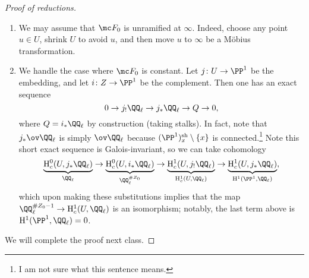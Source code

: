 \documentclass[../notes.tex]{subfiles}
\begin{document}
\begin{proof}[Proof of reductions]
\begin{enumerate}
		\item We may assume that $\mc F_0$ is unramified at $\infty$. Indeed, choose any point $u\in U$, shrink $U$ to avoid $u$, and then move $u$ to $\infty$ be a M\"obius transformation.

		\item We handle the case where $\mc F_0$ is constant. Let $j\colon U\to\PP^1$ be the embedding, and let $i\colon Z\to\PP^1$ be the complement. Then one has an exact sequence
		\[0\to j_!\QQ_\ell\to j_*\QQ_\ell\to Q\to0,\]
		where $Q=i_*\QQ_\ell$ by construction (taking stalks). In fact, note that $j_*\ov\QQ_\ell$ is simply $\ov\QQ_\ell$ because $(\PP^1)^{\mathrm{sh}}_x\setminus\{x\}$ is connected.\footnote{I am not sure what this sentence means.} Note this short exact sequence is Galois-invariant, so we can take cohomology
		\[\underbrace{\mathrm H^0_c(U,j_*\QQ_\ell)}_{\QQ_\ell}\to\underbrace{\mathrm H^0_c(U,i_*\QQ_\ell)}_{\QQ_\ell^{\#Z_0}}\to\underbrace{\mathrm H^1_c(U,j_!\QQ_\ell)}_{\mathrm H^1_c(U,\QQ_\ell)}\to\underbrace{\mathrm H^1_c(U,j_*\QQ_\ell)}_{\mathrm H^1(\PP^1,\QQ_\ell)},\]
		which upon making these substitutions implies that the map $\QQ_\ell^{\#Z_0-1}\to\mathrm H^1_c(U,\QQ_\ell)$ is an isomorphism; notably, the last term above is $\mathrm H^1(\PP^1,\QQ_\ell)=0$.
	\end{enumerate}
	We will complete the proof next class.
\end{proof}
\end{document}

